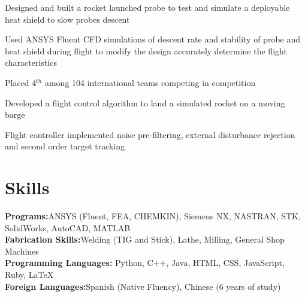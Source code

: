 \documentclass[letterpaper,11pt]{cv_format}
\begin{document}
\begin{c_itemize}
    \item Designed and built a rocket launched probe to test and simulate a deployable heat shield to slow probes descent 
    \item Used ANSYS Fluent CFD simulations of descent rate and stability of probe and heat shield during flight to modify the design accurately determine the flight characteristics
    \item Placed 4$^{th}$ among 104 international teams competing in competition
\end{c_itemize}

\begin{c_itemize}
    \item Developed a flight control algorithm to land a simulated rocket on a moving barge
    \item Flight controller implemented noise pre-filtering, external disturbance rejection and second order target tracking
\end{c_itemize}


\section{Skills}
\textbf{Programs:}ANSYS (Fluent, FEA, CHEMKIN), Siemens NX, NASTRAN, STK, SolidWorks, AutoCAD, MATLAB \\
\textbf{Fabrication Skills:}Welding (TIG and Stick), Lathe, Milling, General Shop Machines\\
\textbf{Programming Languages:} Python, C++, Java, HTML, CSS,  JavaScript, Ruby, \LaTeX\\
\textbf{Foreign Languages:}Spanish (Native Fluency), Chinese (6 years of study)
\end{document}

